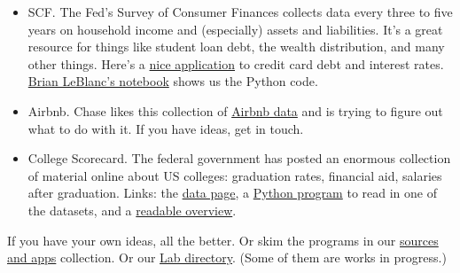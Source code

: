 \documentclass[11pt]{article}
\begin{document}
\begin{itemize}
\begin{itemize}
\item SCF.  The Fed's Survey of Consumer Finances collects data every three to five years
on household income and (especially) assets and liabilities.
It's a great resource for things like student loan debt, the wealth distribution,
and many other things.
Here's a
\href{http://www.npr.org/sections/money/2015/08/14/431263285/13-years-of-american-credit-cards-in-one-graph}
{nice application}
to credit card debt and interest rates.
\href{https://github.com/DaveBackus/Data_Bootcamp/blob/master/Code/Lab/SCF_data_experiment_Brian.ipynb}
{Brian LeBlanc's notebook}
shows us the Python code.

\item Airbnb.
Chase likes this collection of \href{http://insideairbnb.com/index.html}{Airbnb data}
and is trying to figure out what to do with it.  If you have ideas, get in touch.

\item {College Scorecard.}
The federal government has posted an enormous collection of material online
about US colleges:  graduation rates, financial aid, salaries after graduation.
Links:  the \href{https://collegescorecard.ed.gov/data/}{data page},
a \href{https://github.com/DaveBackus/Data_Bootcamp/blob/master/Code/Lab/College_Scorecard_data_input.py}
{Python program} to read in one of the datasets,
and a \href{http://www.vox.com/2015/9/12/9314695/college-scorecard-earnings}{readable overview}.

\end{itemize}

If you have your own ideas, all the better.  
Or skim the programs in our
\href{https://docs.google.com/document/d/1L2ZDKFyyqfOrCGbNcCIE9mmgap4tjkTNuw32hK4c6BI/edit?usp=sharing}
{sources and apps} collection.
Or our
\href{https://github.com/DaveBackus/Data_Bootcamp/tree/master/Code/Lab}{Lab directory}.
(Some of them are works in progress.)


\begin{comment}
\item {\bf IPython notebook of data input chapter.\/}
Create a notebook that goes through the material of the data input chapter of the book,
or perhaps one of the other early chapters.
The result should be a notebook that allows others to teach themselves.
Include blank cells for exercises.
\end{comment}
\end{itemize}



\end{document}
